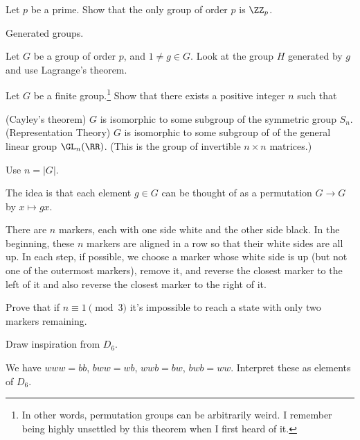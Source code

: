 \begin{sproblem}
	Let $p$ be a prime.
	Show that the only group of order $p$ is $\Zc p$.
	\begin{hint}
		Generated groups.
	\end{hint}
	\begin{sol}
		Let $G$ be a group of order $p$, and $1 \neq g \in G$.
		Look at the group $H$ generated by $g$ and use Lagrange's theorem.
	\end{sol}
\end{sproblem}

\begin{dproblem}
	\gim
	Let $G$ be a finite group.\footnote{
		In other words, permutation groups can be arbitrarily weird.
		I remember being highly unsettled by this theorem when I first heard of it.}
	Show that there exists a positive integer $n$ such that
	\begin{enumerate}[(a)]
		\ii (Cayley's theorem) $G$ is isomorphic to some subgroup of the symmetric group $S_n$.
		\ii (Representation Theory) $G$ is isomorphic to some subgroup of
		of the general linear group $\GL_n(\RR)$.
		(This is the group of invertible $n \times n$ matrices.)
	\end{enumerate}
	\label{thm:cayley_theorem}
	\begin{hint}
		Use $n = \left\lvert G \right\rvert$.
	\end{hint}
	\begin{sol}
		The idea is that each element $g \in G$ can be thought of as a permutation
		$G \to G$ by $x \mapsto gx$.
	\end{sol}
\end{dproblem}

\begin{problem}
	[MOP 2006] \gim
	There are $n$ markers, each with one side white and the other side black.
	In the beginning, these $n$ markers are aligned in a row so that their white sides are all up.
	In each step, if possible, we choose a marker whose white side is up (but not one of the outermost markers),
	remove it, and reverse the closest marker to the left of it and also reverse the closest marker to the right of it.
	
	Prove that if $n \equiv 1 \pmod 3$ it's impossible to reach a state with only two markers remaining.
	\begin{hint}
		Draw inspiration from $D_6$.
	\end{hint}
	\begin{sol}
		We have $www = bb$, $bww = wb$, $wwb = bw$, $bwb = ww$.
		Interpret these as elements of $D_6$.
	\end{sol}
\end{problem}


